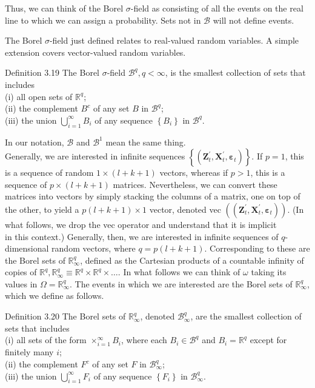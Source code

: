\documentclass[10pt]{article}
\begin{document}
Thus, we can think of the Borel $\sigma$-field as consisting of all the events on the real line to which we can assign a probability. Sets not in $\mathcal{B}$ will not define events.

The Borel $\sigma$-field just defined relates to real-valued random variables. A simple extension covers vector-valued random variables.

Definition 3.19 The Borel $\sigma$-field $\mathcal{B}^{q}, q<\infty$, is the smallest collection of sets that includes\\
(i) all open sets of $\mathbb{R}^{q}$;\\
(ii) the complement $B^{c}$ of any set $B$ in $\mathcal{B}^{q}$;\\
(iii) the union $\bigcup_{i=1}^{\infty} B_{i}$ of any sequence $\left\{B_{i}\right\}$ in $\mathcal{B}^{q}$.

In our notation, $\mathcal{B}$ and $\mathcal{B}^{1}$ mean the same thing.\\
Generally, we are interested in infinite sequences $\left\{\left(\mathbf{Z}_{t}^{\prime}, \mathbf{X}_{t}^{\prime}, \boldsymbol{\varepsilon}_{t}\right)\right\}$. If $p=1$, this is a sequence of random $1 \times(l+k+1)$ vectors, whereas if $p>1$, this is a sequence of $p \times(l+k+1)$ matrices. Nevertheless, we can convert these matrices into vectors by simply stacking the columns of a matrix, one on top of the other, to yield a $p(l+k+1) \times 1$ vector, denoted vec $\left(\left(\mathbf{Z}_{t}^{\prime}, \mathbf{X}_{t}^{\prime}, \boldsymbol{\varepsilon}_{t}\right)\right)$. (In what follows, we drop the vec operator and understand that it is implicit\\
in this context.) Generally, then, we are interested in infinite sequences of $q$-dimensional random vectors, where $q=p(l+k+1)$. Corresponding to these are the Borel sets of $\mathbb{R}_{\infty}^{q}$, defined as the Cartesian products of a countable infinity of copies of $\mathbb{R}^{q}, \mathbb{R}_{\infty}^{q} \equiv \mathbb{R}^{q} \times \mathbb{R}^{q} \times \ldots$. In what follows we can think of $\omega$ taking its values in $\Omega=\mathbb{R}_{\infty}^{q}$. The events in which we are interested are the Borel sets of $\mathbb{R}_{\infty}^{q}$, which we define as follows.

Definition 3.20 The Borel sets of $\mathbb{R}_{\infty}^{q}$, denoted $\mathcal{B}_{\infty}^{q}$, are the smallest collection of sets that includes\\
(i) all sets of the form $\times_{i=1}^{\infty} B_{i}$, where each $B_{i} \in \mathcal{B}^{q}$ and $B_{i}=\mathbb{R}^{q}$ except for finitely many $i$;\\
(ii) the complement $F^{c}$ of any set $F$ in $\mathcal{B}_{\infty}^{q}$;\\
(iii) the union $\bigcup_{i=1}^{\infty} F_{i}$ of any sequence $\left\{F_{i}\right\}$ in $\mathcal{B}_{\infty}^{q}$.
\end{document}
